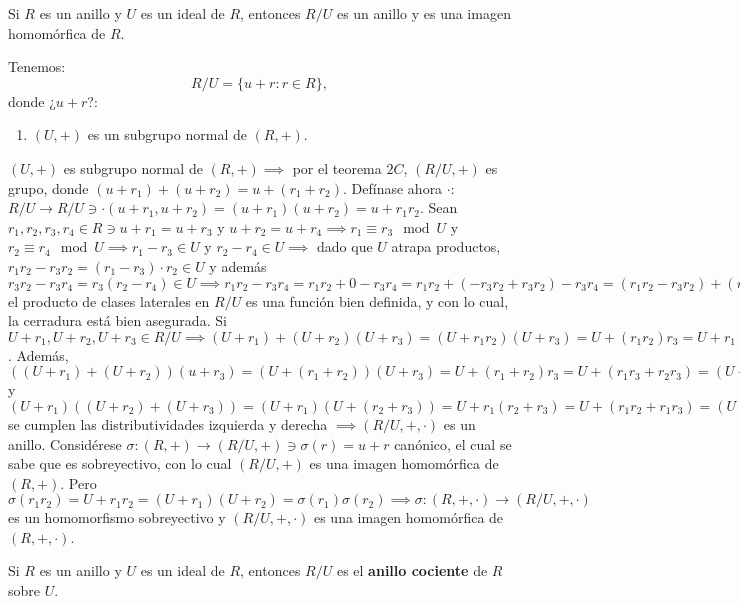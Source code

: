 \begin{lema}[3.6]
    Si $R$ es un anillo y $U$ es un ideal de $R$, entonces $R/U$ es un anillo y es una imagen homomórfica de $R$. 
    \begin{cajita}
        Tenemos:
        $$R/U=\{u+r:r\in R\},$$
        donde ¿$u+r$?:
        \begin{enumerate}
            \item $(U,+)$ es un subgrupo normal de $(R,+)$. 
        \end{enumerate}
    \end{cajita}
    \begin{dem}
        $(U,+)$ es subgrupo normal de $(R,+)\implies $ por el teorema $2C$, $(R/U,+)$ es grupo, donde $(u+r_1)+(u+r_2)=u+(r_1+r_2)$. Defínase ahora $\cdot$: $R/U\to R/U\ni \cdot (u+r_1,u+r_2)=(u+r_1)(u+r_2)=u+r_1r_2$. Sean $r_1,r_2,r_3,r_4\in R\ni u+r_1=u+r_3$ y $u+r_2 = u+r_4\implies r_1\equiv r_3\mod U$ y $r_2\equiv r_4 \mod U\implies r_1-r_3\in U$ y $r_2-r_4\in U\implies $ dado que $U$ atrapa productos, $r_1r_2-r_3r_2=(r_1-r_3)\cdot r_2\in U$ y además $r_3r_2-r_3r_4=r_3(r_2-r_4)\in U\implies r_1r_2-r_3r_4 =r_1r_2+0-r_3r_4=r_1r_2+(-r_3r_2+r_3r_2)-r_3r_4 = (r_1r_2-r_3r_2)+(r_3r_2-r_3r_4)\in U\implies r_1r_2\equiv r_3r_4 \mod U\implies U+r_1r_2 = U+r_3r_4\implies (U+r_1)(U+r_2)=U+r_1r_2 = U+r_3r_4 = (U+r_3)(U+r_4)\implies$ el producto de clases laterales en $R/U$ es una función bien definida, y con lo cual, la cerradura está bien asegurada. Si $U+r_1, U+r_2,U+r_3\in R/U\implies (U+r_1)+(U+r_2)(U+r_3)=(U+r_1r_2)(U+r_3)=U+(r_1r_2)r_3= U +r_1(r_2r_3)=(U+r_1)(U+r_2r_3)=(U+r_1)((U+r_2)(U+r_3))\implies $. Además, $((U+r_1)+(U+r_2))(u+r_3)=(U+(r_1+r_2))(U+r_3)=U+(r_1+r_2)r_3 = U + (r_1r_3 + r_2r_3)=(U+r_1r_3)(U+r_2r_3)=(U+r_1)(U+r_3)+(U+r_2)(U+r_3)$ y $(U+r_1)((U+r_2)+(U+r_3))=(U+r_1)(U+(r_2+r_3))=U+r_1(r_2+r_3)= U+(r_1r_2 + r_1r_3)= (U+r_1r_2)+(U+r_1r_3)=(U+r_1)(U+r_2)+(U+r_1)(U+r_3)\implies $ se cumplen las distributividades izquierda y derecha $\implies (R/U,+,\cdot)$ es un anillo. Considérese $\sigma: (R,+)\to (R/U,+)\ni \sigma(r)=u+r$ canónico, el cual se sabe que es sobreyectivo, con lo cual $(R/U,+)$ es una imagen homomórfica de $(R,+)$. Pero $\sigma(r_1r_2)=U+r_1r_2=(U+r_1)(U+r_2)=\sigma(r_1)\sigma(r_2)\implies \sigma: (R,+,\cdot)\to (R/U,+,\cdot)$ es un homomorfismo sobreyectivo y $(R/U,+,\cdot)$
        es una imagen homomórfica de $(R,+,\cdot)$.
    \end{dem}
\end{lema}

\begin{definicion}
    Si $R$ es un anillo y $U$ es un ideal de $R$, entonces $R/U$ es el \textbf{anillo cociente} de $R$ sobre $U$.
\end{definicion}

